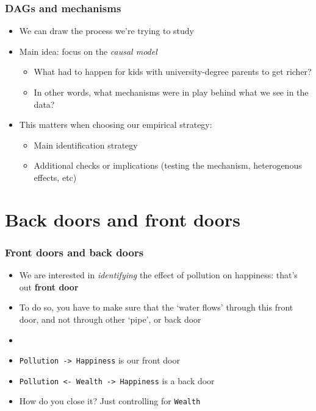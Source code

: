 \begin{frame}
\frametitle{DAGs and mechanisms}
\centering

\begin{itemize}[<+->]
\item We can draw the process we're trying to study
\item Main idea: focus on the \textit{causal model}
  \begin{itemize}
  \item What had to happen for kids with university-degree parents to get richer?
  \item In other words, what mechanisms were in play behind what we see in the data?
  \end{itemize}
\item This matters when choosing our empirical strategy:
  \begin{itemize}
  \item Main identification strategy
  \item Additional checks or implications (testing the mechanism, heterogenous effects, etc)
  \end{itemize}
\end{itemize}

\end{frame}
\note{}

\section{Back doors and front doors}

\begin{frame}
\frametitle{Front doors and back doors}
\centering

\begin{itemize}
  \item<1-> We are interested in \textit{identifying} the effect of pollution on happiness: that's out \textbf{front door}
  \item<2-> To do so, you have to make sure that the `water flows' through this front door, and not through other `pipe', or back door
  \item[]
  \item<3-> \texttt{Pollution -> Happiness} is our front door
  \item<3-> \texttt{Pollution <- Wealth -> Happiness} is a back door
  \item<4-> How do you close it? Just controlling for \texttt{Wealth}
\end{itemize}

\end{frame}
\note{}

